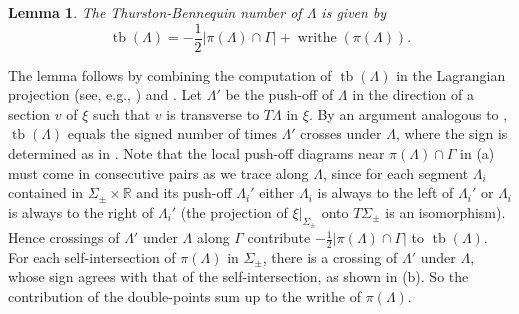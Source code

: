 \documentclass[11pt]{amsart}
\makeatletter
\renewenvironment{proof}[1][\proofname] {\par\pushQED{\qed}{\normalfont\bfseries\topsep6\p@\@plus6\p@\relax #1\@addpunct{.} }}{\popQED\endtrivlist\@endpefalse}
\theoremstyle{mystyle}
\newtheorem{lemma}[lemma]{Lemma}
\newcommand{\R}{\mathbb{R}}
\newcommand{\<}{\langle}
\renewcommand{\>}{\rangle}
\DeclareMathOperator{\tb}{tb}
\DeclareMathOperator{\writhe}{writhe}
\makeatother
\begin{document}
\begin{lemma} \it
	The Thurston-Bennequin number of $\Lambda$ is given by \[\tb(\Lambda) = -\frac{1}{2}|\pi(\Lambda) \cap \Gamma| + \writhe(\pi(\Lambda)).\]
\end{lemma}

\begin{proof}
    The lemma follows by combining the computation of $\tb(\Lambda)$ in the Lagrangian projection (see, e.g., \cite[Prop. 3.5.11]{geiges2006contact}) and \cite[Thm. 3.5.1]{etnyre2025convex}. Let $\Lambda'$ be the push-off of $\Lambda$ in the direction of a section $v$ of $\xi$ such that $v$ is transverse to $T\Lambda$ in $\xi$. By an argument analogous to \cite[Prop. 3.4.14]{geiges2006contact}, $\tb(\Lambda)$ equals the signed number of times $\Lambda'$ crosses under $\Lambda$, where the sign is determined as in . Note that the local push-off diagrams near $\pi(\Lambda) \cap \Gamma$ in (a) must come in consecutive pairs as we trace along $\Lambda$, since for each segment $\Lambda_i$ contained in $\Sigma_\pm \times \R$ and its push-off $\Lambda_i'$ either $\Lambda_i$ is always to the left of $\Lambda_i'$ or $\Lambda_i$ is always to the right of $\Lambda_i'$ (the projection of $\xi|_{\Sigma_\pm}$ onto $T\Sigma_\pm$ is an isomorphism). Hence crossings of $\Lambda'$ under $\Lambda$ along $\Gamma$ contribute $-\frac{1}{2}|\pi(\Lambda) \cap \Gamma|$ to $\tb(\Lambda)$. For each self-intersection of $\pi(\Lambda)$ in $\Sigma_\pm$, there is a crossing of $\Lambda'$ under $\Lambda$, whose sign agrees with that of the self-intersection, as shown in (b). So the contribution of the double-points sum up to the writhe of $\pi(\Lambda)$.
\end{proof}
\end{document}
